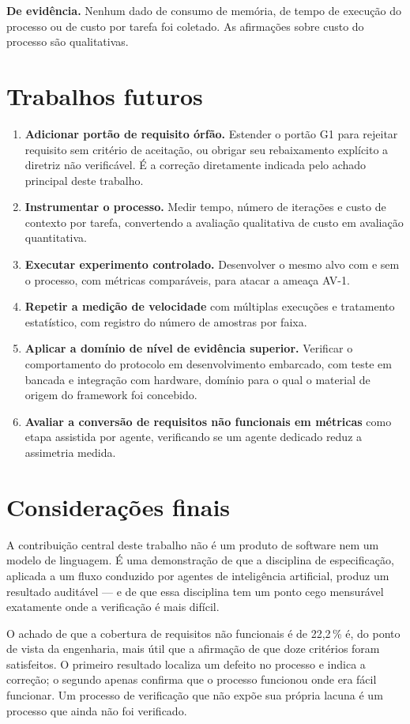 \textbf{De evidência.} Nenhum dado de consumo de memória, de tempo de execução do
processo ou de custo por tarefa foi coletado. As afirmações sobre custo do
processo são qualitativas.

\section{Trabalhos futuros}
\label{sec:conc-futuros}

\begin{enumerate}
	\item \textbf{Adicionar portão de requisito órfão.} Estender o portão G1 para
	rejeitar requisito sem critério de aceitação, ou obrigar seu rebaixamento
	explícito a diretriz não verificável. É a correção diretamente indicada pelo
	achado principal deste trabalho.

	\item \textbf{Instrumentar o processo.} Medir tempo, número de iterações e
	custo de contexto por tarefa, convertendo a avaliação qualitativa de custo em
	avaliação quantitativa.

	\item \textbf{Executar experimento controlado.} Desenvolver o mesmo alvo com e
	sem o processo, com métricas comparáveis, para atacar a ameaça AV-1.

	\item \textbf{Repetir a medição de velocidade} com múltiplas execuções e
	tratamento estatístico, com registro do número de amostras por faixa.

	\item \textbf{Aplicar a domínio de nível de evidência superior.} Verificar o
	comportamento do protocolo em desenvolvimento embarcado, com teste em bancada e
	integração com hardware, domínio para o qual o material de origem do framework
	foi concebido.

	\item \textbf{Avaliar a conversão de requisitos não funcionais em métricas}
	como etapa assistida por agente, verificando se um agente dedicado reduz a
	assimetria medida.
\end{enumerate}

\section{Considerações finais}
\label{sec:conc-finais}

A contribuição central deste trabalho não é um produto de software nem um modelo
de linguagem. É uma demonstração de que a disciplina de especificação, aplicada a
um fluxo conduzido por agentes de inteligência artificial, produz um resultado
auditável --- e de que essa disciplina tem um ponto cego mensurável exatamente
onde a verificação é mais difícil.

O achado de que a cobertura de requisitos não funcionais é de 22,2\,\% é, do
ponto de vista da engenharia, mais útil que a afirmação de que doze critérios
foram satisfeitos. O primeiro resultado localiza um defeito no processo e indica
a correção; o segundo apenas confirma que o processo funcionou onde era fácil
funcionar. Um processo de verificação que não expõe sua própria lacuna é um
processo que ainda não foi verificado.
